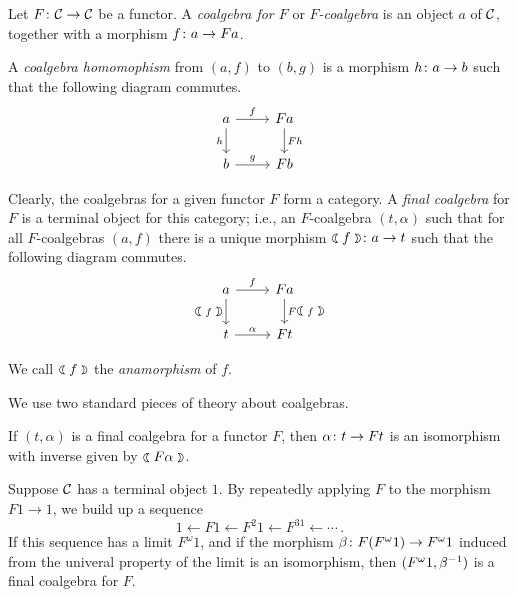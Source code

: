 \documentclass[11pt]{report}
\begin{document}
\begin{definition}
  Let $F \colon {\mathcal{C}} \to {\mathcal{C}}$ be a functor.  
  A \emph{coalgebra for $F$} or \emph{$F$-coalgebra} is an object $a$ of ${\mathcal{C}}$, together with a morphism $f\colon a \to Fa$.

  A \emph{coalgebra homomophism} from $(a,f)$ to $(b,g)$ is a morphism $h\colon a \to b$ such that the following diagram commutes.
  \[
    \begin{tikzcd}
      a \arrow[r, "f"] \arrow[d, "h"']
        & Fa \arrow[d, "Fh"] \\
      b \arrow[r, "g"]
        & Fb
    \end{tikzcd}
    \]

  Clearly, the coalgebras for a given functor $F$ form a category.  
  A \emph{final coalgebra} for $F$ is a terminal object for this category; i.e., an $F$-coalgebra $(t,\alpha)$ such that for all $F$-coalgebras $(a,f)$ there is a unique morphism $\fcoal f \from a \to t$ such that the following diagram commutes.
  \[
    \begin{tikzcd}
      a \arrow[r, "f"] \arrow[d, "\fcoal f"']
        & Fa \arrow[d, "F\fcoal f"] \\
      t \arrow[r, "\alpha"]
        & Ft
    \end{tikzcd}
    \]
\end{definition}
We call $\fcoal f$ the \emph{anamorphism} of $f$.

We use two standard pieces of theory about coalgebras.  

\begin{theorem}
  If $(t,\alpha)$ is a final coalgebra for a functor $F$, then $\alpha\colon t \to Ft$ is an isomorphism with inverse given by $\fcoal{F\alpha}$.
\end{theorem}

\begin{theorem}
  Suppose ${\mathcal{C}}$ has a terminal object $1$.  
  By repeatedly applying $F$ to the morphism $F1 \to 1$, we build up a sequence
  \[
    1 \leftarrow F1 \leftarrow F^2 1 \leftarrow F^31 \leftarrow \cdots\,.
    \]
  If this sequence has a limit $F^{\omega}1$, and if the morphism $\beta\colon F(F^{\omega}1) \to F^{\omega}1$ induced from the univeral property of the limit is an isomorphism, then $(F^{\omega}1,\beta^{-1})$ is a final coalgebra for $F$.
\end{theorem}
\end{document}
